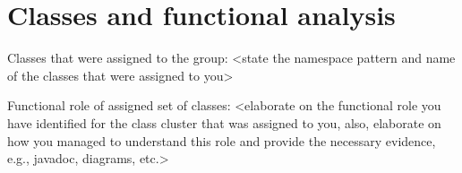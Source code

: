 \chapter{Classes and functional analysis}






Classes that were assigned to the group: <state the namespace pattern and name of the classes that were assigned to you>

Functional role of assigned set of classes: <elaborate on the functional role you have identified for the class cluster that was assigned to you, also, elaborate on how you managed to understand this role and provide the necessary evidence, e.g., javadoc, diagrams, etc.>

\lipsum[1-4]